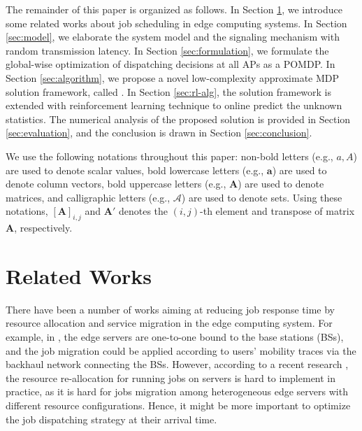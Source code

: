 The remainder of this paper is organized as follows.
In Section \ref{sec:review}, we introduce some related works about job scheduling in edge computing systems.
In Section \ref{sec:model}, we elaborate the system model and the signaling mechanism with random transmission latency.
In Section \ref{sec:formulation}, we formulate the global-wise optimization of dispatching decisions at all APs as a POMDP.
In Section \ref{sec:algorithm}, we propose a novel low-complexity approximate MDP solution framework, called \algname.
In Section \ref{sec:rl-alg}, the solution framework is extended with reinforcement learning technique to online predict the unknown statistics.
The numerical analysis of the proposed solution is provided in Section \ref{sec:evaluation}, and the conclusion is drawn in Section \ref{sec:conclusion}.

We use the following notations throughout this paper: 
non-bold letters (e.g., $a, A$) are used to denote scalar values,
bold lowercase letters (e.g., $\mathbf{a}$) are used to denote column vectors,
bold uppercase letters (e.g., $\mathbf{A}$) are used to denote matrices,
and calligraphic letters (e.g., $\mathcal{A}$) are used to denote sets.
Using these notations, $[\mathbf{A}]_{i,j}$ and $\mathbf{A}'$ denotes the $(i,j)$-th element and transpose of matrix $\mathbf{A}$, respectively.

\section{Related Works}
\label{sec:review}
There have been a number of works aiming at reducing job response time by resource allocation and service migration in the edge computing system.
For example, in \cite{TON19-WangSq}, the edge servers are one-to-one bound to the base stations (BSs), and the job migration could be applied according to users' mobility traces via the backhaul network connecting the BSs.
However, according to a recent research \cite{INFOCOM19-WuC}, the resource re-allocation for running jobs on servers is hard to implement in practice, as it is hard for jobs migration among heterogeneous edge servers with different resource configurations.
Hence, it might be more important to optimize the job dispatching strategy at their arrival time.

